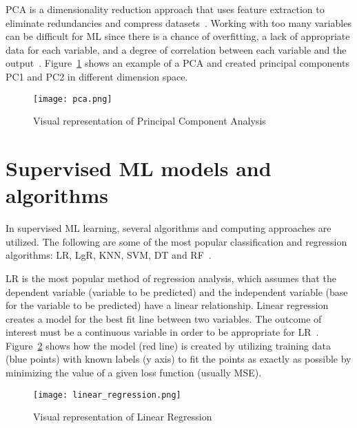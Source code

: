 \gls{PCA} is a dimensionality reduction approach that uses feature extraction to eliminate redundancies and compress datasets~\cite{2020WhatIBMb}. Working with too many variables can be difficult for \gls{ML} since there is a chance of overfitting, a lack of appropriate data for each variable, and a degree of correlation between each variable and the output~\cite{Chugh2018TypesKnow}. Figure~\ref{fig:pca} shows an example of a \gls{PCA} and created principal components PC1 and PC2 in different dimension space.

\begin{figure}[htbp]
    \centering
    \texttt{[image: pca.png]}
    \caption{Visual representation of Principal Component Analysis~\cite{Sah2020MachineTypes}}
    \label{fig:pca}
\end{figure}


\section{Supervised ML models and algorithms}

In supervised \gls{ML} learning, several algorithms and computing approaches are utilized. The following are some of the most popular classification and regression algorithms: \gls{LR}, \gls{LgR}, \gls{KNN}, \gls{SVM}, \gls{DT} and \gls{RF}~\cite{2020WhatIBM,Chugh2018TypesKnow}.

\gls{LR} is the most popular method of regression analysis, which assumes that the dependent variable (variable to be predicted) and the independent variable (base for the variable to be predicted) have a linear relationship. Linear regression creates a model for the best fit line between two variables. The outcome of interest must be a continuous variable in order to be appropriate for \gls{LR}~\cite{Worster2007UnderstandingAnalyses}. Figure~\ref{fig:linear_regression} shows how the model (red line) is created by utilizing training data (blue points) with known labels (y axis) to fit the points as exactly as possible by minimizing the value of a given loss function (usually \gls{MSE}).

\begin{figure}[htbp]
    \centering
    \texttt{[image: linear\_regression.png]}
    \caption{Visual representation of Linear Regression~\cite{Nasteski2017AnMethods}}
    \label{fig:linear_regression}
\end{figure}

